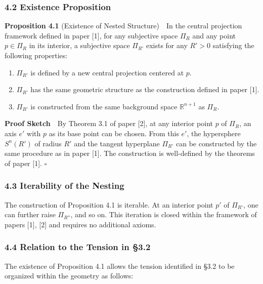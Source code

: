 \documentclass[a4paper,11pt]{article}
\theoremstyle{definition}
\providecommand{\tightlist}{\setlength{\itemsep}{0pt}\setlength{\parskip}{0pt}}
\begin{document}
\subsubsection{4.2 Existence Proposition}\label{existence-proposition}

\textbf{Proposition 4.1} (Existence of Nested Structure)　In the central projection framework defined in paper {[}1{]}, for any subjective space \(\Pi_R\) and any point \(p \in \Pi_R\) in its interior, a subjective space \(\Pi_{R'}\) exists for any \(R' > 0\) satisfying the following properties:

\begin{enumerate}
\def\labelenumi{\arabic{enumi}.}
\tightlist
\item
  \(\Pi_{R'}\) is defined by a new central projection centered at \(p\).
\item
  \(\Pi_{R'}\) has the same geometric structure as the construction defined in paper {[}1{]}.
\item
  \(\Pi_{R'}\) is constructed from the same background space \(\mathbb{R}^{n+1}\) as \(\Pi_R\).
\end{enumerate}

\textbf{Proof Sketch}　By Theorem 3.1 of paper {[}2{]}, at any interior point \(p\) of \(\Pi_R\), an axis \(e'\) with \(p\) as its base point can be chosen. From this \(e'\), the hypersphere \(S^n(R')\) of radius \(R'\) and the tangent hyperplane \(\Pi_{R'}\) can be constructed by the same procedure as in paper {[}1{]}. The construction is well-defined by the theorems of paper {[}1{]}. \(\square\)

\subsubsection{4.3 Iterability of the Nesting}\label{iterability-of-the-nesting}

The construction of Proposition 4.1 is iterable. At an interior point \(p'\) of \(\Pi_{R'}\), one can further raise \(\Pi_{R''}\), and so on. This iteration is closed within the framework of papers {[}1{]}, {[}2{]} and requires no additional axioms.

\subsubsection{4.4 Relation to the Tension in §3.2}\label{relation-to-the-tension-in-3.2}

The existence of Proposition 4.1 allows the tension identified in §3.2 to be organized within the geometry as follows:
\end{document}
